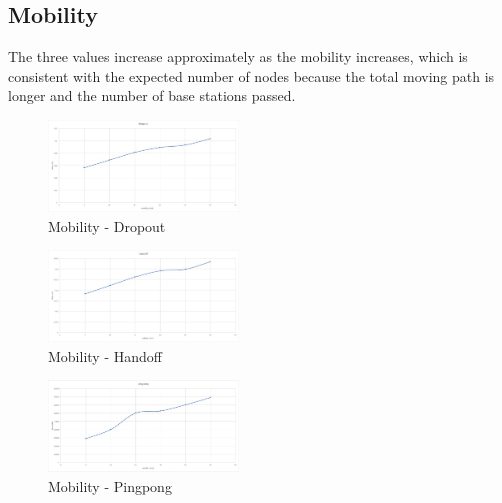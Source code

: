 \documentclass[a4paper]{IEEEtran}
\begin{document}
\subsection{Mobility}
The three values ​​increase approximately as the mobility increases, which is consistent with the expected number of nodes because the total moving path is longer and the number of base stations passed.
\begin{figure}[h]
    \includegraphics[width=0.45\textwidth]{mobility/dropout}
    \caption{Mobility - Dropout}
    \label{fig:mesh4}
\end{figure}
\begin{figure}[h]
    \includegraphics[width=0.45\textwidth]{mobility/handoff}
    \caption{Mobility - Handoff}
    \label{fig:mesh5}
\end{figure}
\begin{figure}[h]
    \includegraphics[width=0.45\textwidth]{mobility/pingpong}
    \caption{Mobility - Pingpong}
    \label{fig:mesh6}
\end{figure}
\end{document}
